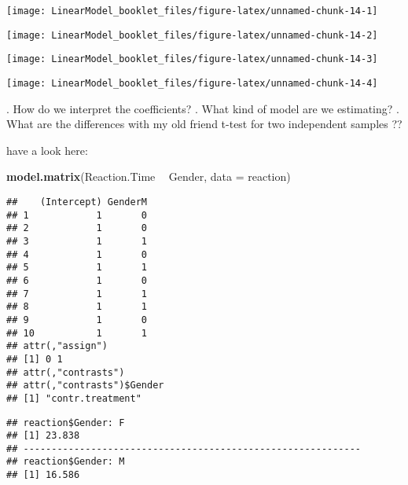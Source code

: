 \documentclass[
]{article}
\newenvironment{Shaded}{\begin{snugshade}}{\end{snugshade}}
\newcommand{\DataTypeTok}[1]{\textcolor[rgb]{0.13,0.29,0.53}{#1}}
\newcommand{\KeywordTok}[1]{\textcolor[rgb]{0.13,0.29,0.53}{\textbf{#1}}}
\newcommand{\NormalTok}[1]{#1}
\newcommand{\OperatorTok}[1]{\textcolor[rgb]{0.81,0.36,0.00}{\textbf{#1}}}
\newcommand{\StringTok}[1]{\textcolor[rgb]{0.31,0.60,0.02}{#1}}
\begin{document}
\begin{center}\texttt{[image: LinearModel\_booklet\_files/figure-latex/unnamed-chunk-14-1]} \end{center}

\begin{center}\texttt{[image: LinearModel\_booklet\_files/figure-latex/unnamed-chunk-14-2]} \end{center}

\begin{center}\texttt{[image: LinearModel\_booklet\_files/figure-latex/unnamed-chunk-14-3]} \end{center}

\begin{center}\texttt{[image: LinearModel\_booklet\_files/figure-latex/unnamed-chunk-14-4]} \end{center}

. How do we interpret the coefficients? . What kind of model are we
estimating? . What are the differences with my old friend t-test for two
independent samples ??

have a look here:

\begin{Shaded}
\begin{Highlighting}[]
\KeywordTok{model.matrix}\NormalTok{(Reaction.Time }\OperatorTok{~}\StringTok{ }\NormalTok{Gender, }\DataTypeTok{data =}\NormalTok{ reaction)}
\end{Highlighting}
\end{Shaded}

\begin{verbatim}
##    (Intercept) GenderM
## 1            1       0
## 2            1       0
## 3            1       1
## 4            1       0
## 5            1       1
## 6            1       0
## 7            1       1
## 8            1       1
## 9            1       0
## 10           1       1
## attr(,"assign")
## [1] 0 1
## attr(,"contrasts")
## attr(,"contrasts")$Gender
## [1] "contr.treatment"
\end{verbatim}

\begin{Shaded}
\end{Shaded}

\begin{verbatim}
## reaction$Gender: F
## [1] 23.838
## ------------------------------------------------------------ 
## reaction$Gender: M
## [1] 16.586
\end{verbatim}
\end{document}
